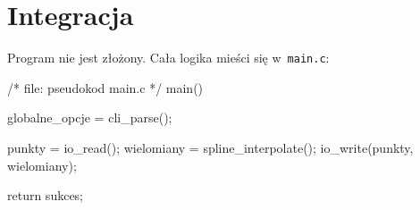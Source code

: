 \documentclass[12pt,a4paper]{article}
\newcommand{\p}[1]{\texttt{#1}}
\begin{document}
\section{Integracja}

Program nie jest złożony. Cała logika mieści się w~\p{main.c}:
\begin{SmallVerbatim}
    /* file: pseudokod main.c */
    main()
    {
      globalne_opcje = cli_parse();

      punkty = io_read();
      wielomiany = spline_interpolate();
      io_write(punkty, wielomiany);
      
      return sukces;
    }
\end{SmallVerbatim}
\end{document}
